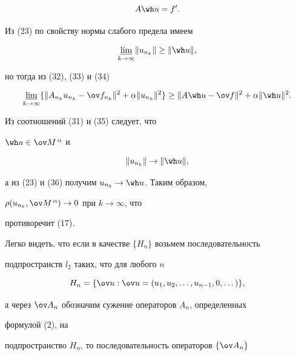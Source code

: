 \begin{pf}
\begin{equation}
A\wh u=f'. 


\end{equation} 


Из (23) по свойству нормы слабого предела имеем 


\begin{equation} 


\underset{k\to\infty}{\varliminf}{}\|u_{n_k}\|\ge\|\wh u\|, 


\end{equation} 


но тогда из (32), (33) и (34) 


\begin{equation} 


\underset{k\to\infty}{\varliminf}\{\|A_{n_k}u_{n_k}-\ov f_{n_k}\|^2+ 


\alpha\|u_{n_k}\|^2\}\ge\|A\wh u-\ov f\|^2+\alpha\|\wh u\|^2. 


\end{equation} 


Из соотношений (31) и (35) следует, что 


$\wh u\in\ov M^{\,\alpha}$ и 


\begin{equation} 


\|u_{n_k}\|\to\|\wh u\|, 


\end{equation} 


а из (23) и (36) получим $u_{n_k}\to\wh u$. Таким образом, 


$\rho(u_{n_k},\ov M^{\,\alpha})\to 0$ при $k\to\infty$, что 


противоречит (17). 


\end{pf} 


 


Легко видеть, что если в качестве $\{H_n\}$ возьмем последовательность 


подпространств $l_2$ таких, что для любого $n$ 


\begin{equation} 


H_n=\{\ov u:\ov u=(u_1,u_2,\dotsc,u_{n-1},0,\dotsc)\}, 


\end{equation} 


а через $\ov A_n$ обозначим сужение операторов $A_n$, определенных 


формулой (2), на 


подпространство $H_n$, то последовательность операторов $\{\ov A_n\}$ 


